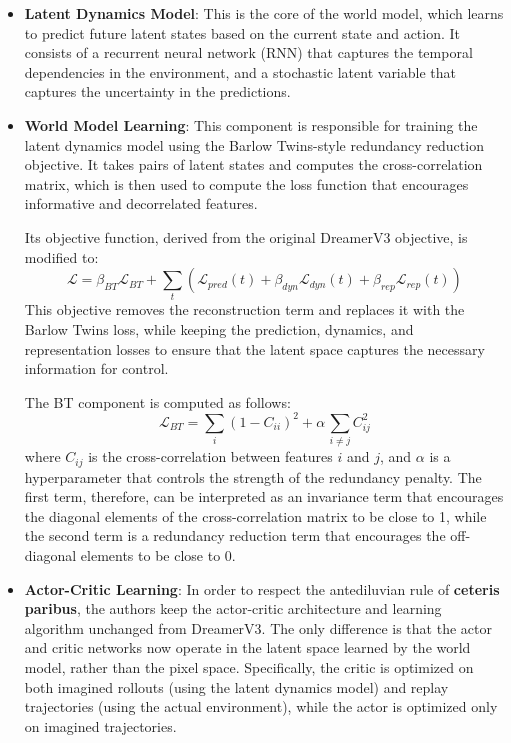 \documentclass{article}
\begin{document}
\begin{itemize}
    \item \textbf{Latent Dynamics Model}: This is the core of the world model, which learns to predict future latent states based on the current state and action. It consists of a recurrent neural network (RNN) that captures the temporal dependencies in the environment, and a stochastic latent variable that captures the uncertainty in the predictions.
    \item \textbf{World Model Learning}: This component is responsible for training the latent dynamics model using the Barlow Twins-style redundancy reduction objective. It takes pairs of latent states and computes the cross-correlation matrix, which is then used to compute the loss function that encourages informative and decorrelated features.

          Its objective function, derived from the original DreamerV3 objective, is modified to:
          \begin{equation}
              \mathcal{L} = \beta_{BT} \mathcal{L}_{BT} + \sum_t \left( \mathcal{L}_{pred} (t) + \beta_{dyn} \mathcal{L}_{dyn} (t) + \beta_{rep} \mathcal{L}_{rep} (t) \right)
          \end{equation}
          This objective removes the reconstruction term and replaces it with the Barlow Twins loss, while keeping the prediction, dynamics, and representation losses to ensure that the latent space captures the necessary information for control.

          The BT component is computed as follows:
          \begin{equation}
              \mathcal{L}_{BT} = \sum_{i} (1 - C_{ii})^2 + \alpha \,\sum_{i \neq j} C_{ij}^2
          \end{equation}
          where $C_{ij}$ is the cross-correlation between features $i$ and $j$, and $\alpha$ is a hyperparameter that controls the strength of the redundancy penalty. The first term, therefore, can be interpreted as an invariance term that encourages the diagonal elements of the cross-correlation matrix to be close to 1, while the second term is a redundancy reduction term that encourages the off-diagonal elements to be close to 0.
    \item \textbf{Actor-Critic Learning}: In order to respect the antediluvian rule of \textbf{ceteris paribus}, the authors keep the actor-critic architecture and learning algorithm unchanged from DreamerV3. The only difference is that the actor and critic networks now operate in the latent space learned by the world model, rather than the pixel space. Specifically, the critic is optimized on both imagined rollouts (using the latent dynamics model) and replay trajectories (using the actual environment), while the actor is optimized only on imagined trajectories.
\end{itemize}
\end{document}
